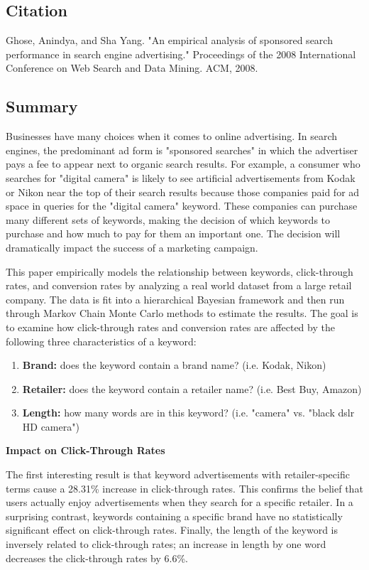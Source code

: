 \documentclass[../summaries.tex]{subfiles}
\begin{document}
\subsection{Citation}
Ghose, Anindya, and Sha Yang. "An empirical analysis of sponsored search performance in search engine advertising." Proceedings of the 2008 International Conference on Web Search and Data Mining. ACM, 2008.

\subsection{Summary}
Businesses have many choices when it comes to online advertising. In search engines, the predominant ad form is "sponsored searches" in which the advertiser pays a fee to appear next to organic search results. For example, a consumer who searches for "digital camera" is likely to see artificial advertisements from Kodak or Nikon near the top of their search results because those companies paid for ad space in queries for the "digital camera" keyword. These companies can purchase many different sets of keywords, making the decision of which keywords to purchase and how much to pay for them an important one. The decision will dramatically impact the success of a marketing campaign.

This paper empirically models the relationship between keywords, click-through rates, and conversion rates by analyzing a real world dataset from a large retail company. The data is fit into a hierarchical Bayesian framework and then run through Markov Chain Monte Carlo methods to estimate the results. The goal is to examine how click-through rates and conversion rates are affected by the following three characteristics of a keyword:

\begin{enumerate}
\item \textbf{Brand:}  does the keyword contain a brand name? (i.e. Kodak, Nikon)
\item \textbf{Retailer:}  does the keyword contain a retailer name? (i.e. Best Buy, Amazon)
\item \textbf{Length:}  how many words are in this keyword? (i.e. "camera" vs. "black dslr HD camera")
\end{enumerate}

\textbf{Impact on Click-Through Rates}

The first interesting result is that keyword advertisements with retailer-specific terms cause a 28.31\% increase in click-through rates. This confirms the belief that users actually enjoy advertisements when they search for a specific retailer. In a surprising contrast, keywords containing a specific brand have no statistically significant effect on click-through rates. Finally, the length of the keyword is inversely related to click-through rates; an increase in length by one word decreases the click-through rates by 6.6\%.
\end{document}
